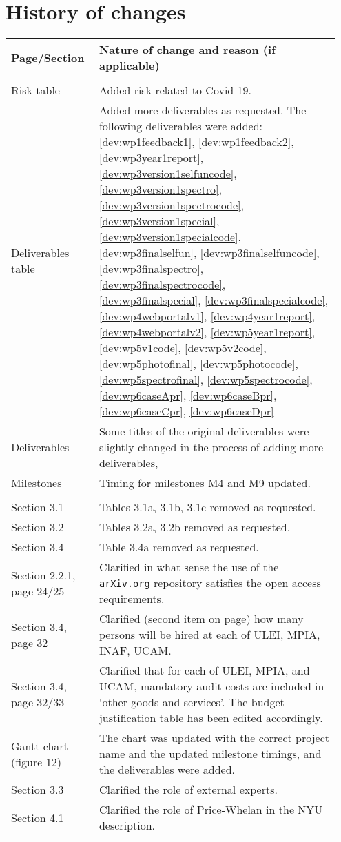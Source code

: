 \section*{History of changes}

\begin{tabular}{|>{\raggedright}p{0.25\linewidth}|>{\raggedright}p{0.7\linewidth}|}
\hline
\textbf{Page/Section} & \textbf{Nature of change and reason (if applicable)} \tabularnewline
\hline
\multicolumn{2}{|l|}{\textbf{Part A}} \tabularnewline
\hline
Risk table & Added risk related to Covid-19. \tabularnewline
\hline
Deliverables table & Added more deliverables as requested. The following deliverables were added: \ref{dev:wp1feedback1}, \ref{dev:wp1feedback2}, \ref{dev:wp3year1report}, \ref{dev:wp3version1selfuncode}, \ref{dev:wp3version1spectro}, \ref{dev:wp3version1spectrocode}, \ref{dev:wp3version1special}, \ref{dev:wp3version1specialcode}, \ref{dev:wp3finalselfun}, \ref{dev:wp3finalselfuncode}, \ref{dev:wp3finalspectro}, \ref{dev:wp3finalspectrocode}, \ref{dev:wp3finalspecial}, \ref{dev:wp3finalspecialcode}, \ref{dev:wp4webportalv1}, \ref{dev:wp4year1report}, \ref{dev:wp4webportalv2}, \ref{dev:wp5year1report}, \ref{dev:wp5v1code}, \ref{dev:wp5v2code}, \ref{dev:wp5photofinal}, \ref{dev:wp5photocode}, \ref{dev:wp5spectrofinal}, \ref{dev:wp5spectrocode}, \ref{dev:wp6caseApr}, \ref{dev:wp6caseBpr}, \ref{dev:wp6caseCpr}, \ref{dev:wp6caseDpr} \tabularnewline
\hline
Deliverables & Some titles of the original deliverables were slightly changed in the process of adding more deliverables, \tabularnewline
\hline
Milestones & Timing for milestones M4 and M9 updated. \tabularnewline
\hline
\multicolumn{2}{|l|}{\textbf{Part B}} \tabularnewline
\hline
Section 3.1 & Tables 3.1a, 3.1b, 3.1c removed as requested. \tabularnewline
\hline
Section 3.2 & Tables 3.2a, 3.2b removed as requested. \tabularnewline
\hline
Section 3.4 & Table 3.4a removed as requested. \tabularnewline
\hline
Section 2.2.1, page 24/25 & Clarified in what sense the use of the \texttt{arXiv.org} repository satisfies the open access requirements. \tabularnewline
\hline
Section 3.4, page 32 & Clarified (second item on page) how many persons will be hired at each of ULEI, MPIA, INAF, UCAM. \tabularnewline
\hline
Section 3.4, page 32/33 & Clarified that for each of ULEI, MPIA, and UCAM, mandatory audit costs are included in `other goods and services'. The budget justification table has been edited accordingly. \tabularnewline
\hline 
Gantt chart (figure 12) & The chart was updated with the correct project name and the updated milestone timings, and the deliverables were added. \tabularnewline
\hline
Section 3.3 & Clarified the role of external experts. \tabularnewline
\hline
Section 4.1 & Clarified the role of Price-Whelan in the NYU description. \tabularnewline
\hline
\end{tabular}